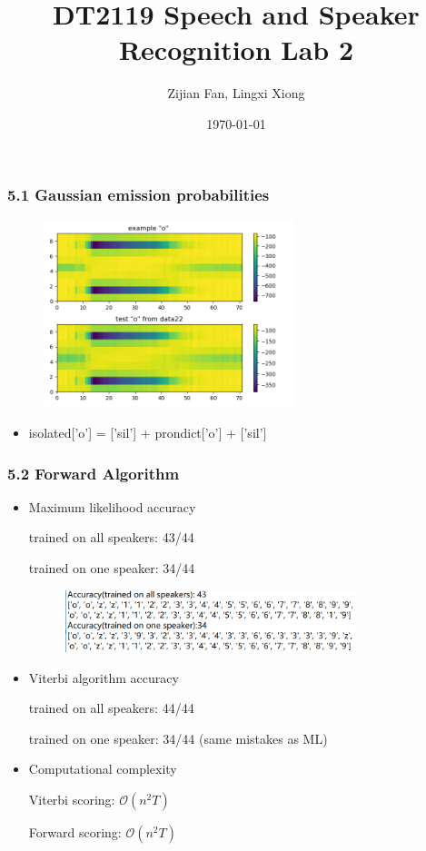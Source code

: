 \documentclass[t]{beamer}
\title
	{DT2119 Speech and Speaker Recognition Lab 2
	}
\author[Zifan, Lingxi]
	{
	Zijian Fan, Lingxi Xiong
	}
\institute{}
\date{}
\date{\today}
\begin{document}
	
\begin{frame}
	\titlepage
\end{frame}
	
\begin{frame}
	\frametitle{5.1 Gaussian emission probabilities}
	\begin{figure}
\centering
		\includegraphics[width=0.65\textwidth]{figures/51.png}
	\end{figure}
			
	\begin{itemize}
		\item  isolated['o'] = ['sil'] + prondict['o'] + ['sil']
	\end{itemize}
\end{frame}
	
\begin{frame}
	\frametitle{5.2 Forward Algorithm}
	\begin{itemize}
		\item Maximum likelihood accuracy
		
trained on all speakers: 43/44

trained on one speaker: 34/44\\

\begin{figure}
\centering
		\includegraphics[width=0.8\textwidth]{figures/52.png}
	\end{figure}

		\item Viterbi algorithm accuracy

trained on all speakers: 44/44

trained on one speaker: 34/44 (same mistakes as ML)\\


		\item Computational complexity

Viterbi scoring: $\mathcal{O}(n^2T)$ 

Forward scoring: $\mathcal{O}(n^2T)$\\

	\end{itemize}
\end{frame}
	
\end{document}
